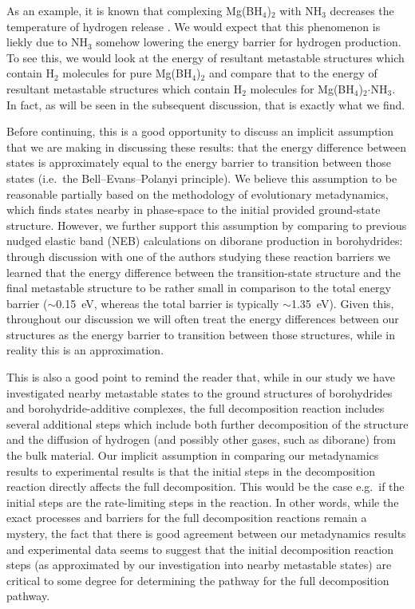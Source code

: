 \documentclass[twocolumn, prb, showpacs]{revtex4-1}
\begin{document}
As an example, it is known that complexing Mg(BH$_4$)$_2$ with NH$_3$ decreases the temperature of hydrogen release \cite{Soloveichik_2008:ammine_magnesium}.
We would expect that this phenomenon is liekly due to NH$_3$ somehow lowering the energy barrier for hydrogen production. To see this, we would look at the energy
of resultant metastable structures which contain H$_2$ molecules for pure Mg(BH$_4$)$_2$ and compare that to the energy of resultant metastable structures which
contain H$_2$ molecules for Mg(BH$_4$)$_2$$\cdot$NH$_3$. In fact, as will be seen in the subsequent discussion, that is exactly what we find.

Before continuing, this is a good opportunity to discuss an implicit assumption that we
are making in discussing these results: that the energy difference between states
is approximately equal to the energy barrier to transition between those states
(i.e.\ the Bell--Evans--Polanyi principle). We believe this assumption to be reasonable
partially based on the methodology of evolutionary metadynamics, which finds states
nearby in phase-space to the initial provided ground-state structure. However,
we further support this assumption by comparing to previous nudged elastic band (NEB)
calculations on diborane production in borohydrides: through discussion with one of the authors
studying these reaction barriers we learned that the energy difference between the transition-state
structure and the final metastable structure to be rather small in comparison to the total energy barrier ($\sim$0.15~eV, whereas the total
barrier is typically $\sim$1.35~eV).\cite{Welchman_2017:decomposition_mechanisms} Given this, throughout our discussion we will often treat the
energy differences between our structures as the energy barrier to transition between those structures,
while in reality this is an approximation.

This is also a good point to remind the reader that, while in our study we have
investigated nearby metastable states to the ground structures of borohydrides
and borohydride-additive complexes, the full decomposition reaction includes several
additional steps which include both further decomposition of the structure and
the diffusion of hydrogen (and possibly other gases, such as diborane) from the
bulk material. Our implicit assumption in comparing our metadynamics results to experimental
results is that the initial steps in the decomposition reaction directly affects the full
decomposition. This would be the case e.g.\ if the initial steps are the rate-limiting steps in the reaction. 
In other words, while the exact processes and barriers for the full decomposition reactions remain a mystery,
the fact that there is good agreement between our metadynamics results and experimental data
seems to suggest that the initial decomposition reaction steps (as approximated by our investigation
into nearby metastable states) are critical to some degree for determining the pathway
for the full decomposition pathway.
\end{document}

